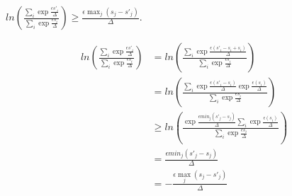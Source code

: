 \begin{lemma}
    \label{priv-inequality}
    $ln\left(\frac{\sum_{i} \exp{\frac{\epsilon s'_i}{\Delta}}}{\sum_{i} \exp{\frac{\epsilon s_i}{\Delta}}}\right) \geq \frac{\epsilon \max_j (s_j - s'_j)}{\Delta}$.
\end{lemma}

\begin{align*}
    ln\left(\frac{\sum_{i} \exp{\frac{\epsilon s'_i}{\Delta}}}{\sum_{i} \exp{\frac{\epsilon s_i}{\Delta}}}\right)
    &= ln\left(\frac{\sum_{i} \exp{\frac{\epsilon (s'_i - s_i + s_i)}{\Delta}}}{\sum_{i} \exp{\frac{\epsilon s_i}{\Delta}}}\right) \\
    &= ln\left(\frac{\sum_{i} \exp{\frac{\epsilon (s'_i - s_i)}{\Delta}}\exp{\frac{\epsilon (s_i)}{\Delta}}}{\sum_{i} \exp{\frac{\epsilon s_i}{\Delta}}}\right) \\
    &\geq ln\left(\frac{\exp{\frac{\epsilon min_j(s'_j - s_j)}{\Delta}} \sum_{i} \exp{\frac{\epsilon (s_i)}{\Delta}}}{\sum_{i} \exp{\frac{\epsilon s_i}{\Delta}}}\right) \\
    &= \frac{\epsilon min_j(s'_j - s_j)}{\Delta} \\
    &= -\frac{\epsilon \max_j (s_j - s'_j)}{\Delta}
\end{align*}






